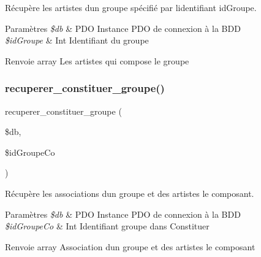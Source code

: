 Récupère les artistes d\textquotesingle{}un groupe spécifié par l\textquotesingle{}identifiant \textquotesingle{}id\+Groupe\textquotesingle{}. 


\begin{DoxyParams}{Paramètres}
{\em \$db} & P\+DO Instance P\+DO de connexion à la B\+DD \\
\hline
{\em \$id\+Groupe} & Int Identifiant du groupe \\
\hline
\end{DoxyParams}
\begin{DoxyReturn}{Renvoie}
array Les artistes qui compose le groupe 
\end{DoxyReturn}
\mbox{\label{fonctionGroupe_8php_a34999ffdf7a39cd7077935546386044b}} 
\subsubsection{\texorpdfstring{recuperer\+\_\+constituer\+\_\+groupe()}{recuperer\_constituer\_groupe()}}
{\footnotesize\ttfamily recuperer\+\_\+constituer\+\_\+groupe (\begin{DoxyParamCaption}\item[{}]{\$db,  }\item[{}]{\$id\+Groupe\+Co }\end{DoxyParamCaption})}



Récupère les associations d\textquotesingle{}un groupe et des artistes le composant. 


\begin{DoxyParams}{Paramètres}
{\em \$db} & P\+DO Instance P\+DO de connexion à la B\+DD \\
\hline
{\em \$id\+Groupe\+Co} & Int Identifiant groupe dans Constituer \\
\hline
\end{DoxyParams}
\begin{DoxyReturn}{Renvoie}
array Association d\textquotesingle{}un groupe et des artistes le composant 
\end{DoxyReturn}
\mbox{\label{fonctionGroupe_8php_ac6a7a3bba5f040d9bf7cc2f55d7c2939}} 
